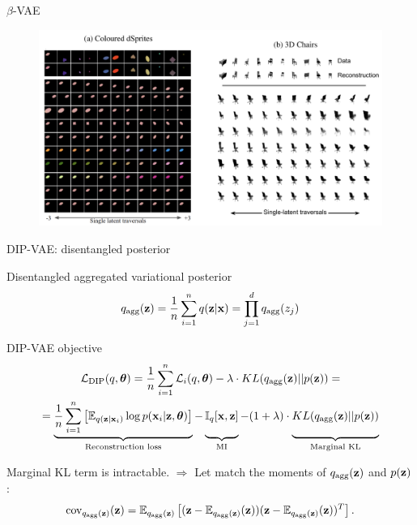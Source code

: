 \begin{frame}{$\beta$-VAE}
	\begin{figure}
		\centering
		\includegraphics[width=1.0\linewidth]{figs/betaVAE_9.png}
	\end{figure}
	
\end{frame}
\begin{frame}{DIP-VAE: disentangled posterior}
	\begin{block}{Disentangled aggregated variational posterior}
		\vspace{-0.3cm}
		\[
		q_{\text{agg}}(\mathbf{z}) = \frac{1}{n} \sum_{i=1}^n q(\mathbf{z} | \mathbf{x}) = \prod_{j=1}^d q_{\text{agg}}(z_j)
		\]
		\vspace{-0.6cm}
	\end{block}
	\begin{block}{DIP-VAE objective}
		\vspace{-0.7cm}
		{\small
			\begin{multline*}
				\cL_{\text{DIP}}(q, \btheta) = \frac{1}{n} \sum_{i=1}^n \cL_i(q, \btheta) -\lambda \cdot KL(q_{\text{agg}}(\bz) || p(\bz)) = \\
				= \underbrace{ \frac{1}{n} \sum_{i=1}^n \left[\bbE_{q(\bz | \bx_i)} \log p(\bx_i | \bz, \btheta)\right]}_{\text{Reconstruction loss}} - \underbrace{\vphantom{\sum_{i=1}^n} \bbI_{q} [\bx, \bz]}_{\text{MI}} - (1 + \lambda) \cdot \underbrace{\vphantom{\sum_{i=1}^n} KL(q_{\text{agg}}(\bz) || p(\bz))}_{\text{Marginal KL}}
			\end{multline*}
		}
		\vspace{-0.3cm}
	\end{block}
	Marginal KL term is intractable. $\Rightarrow$
	Let match the moments of $q_{\text{agg}}(\mathbf{z})$ and $p(\mathbf{z})$:
	\vspace{-0.3cm}
	\[
	\text{cov}_{q_{\text{agg}}(\mathbf{z})}(\mathbf{z}) = \mathbb{E}_{q_{\text{agg}}(\mathbf{z})} \left[ (\mathbf{z} - \mathbb{E}_{q_{\text{agg}}(\mathbf{z})}(\mathbf{z})) (\mathbf{z} - \mathbb{E}_{q_{\text{agg}}(\mathbf{z})}(\mathbf{z}))^T \right].
	\]
\end{frame}
